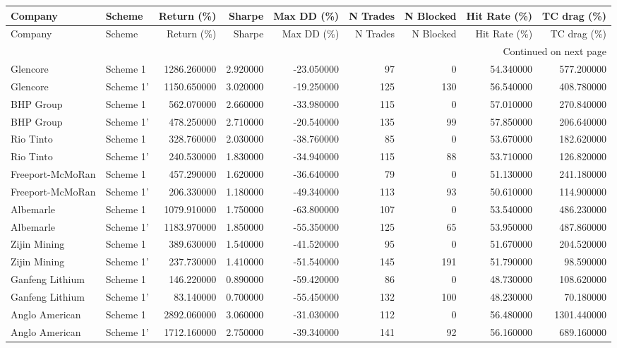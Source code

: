 \begin{longtable}{llrrrrrrr}
\toprule
Company & Scheme & Return (\%) & Sharpe & Max DD (\%) & N Trades & N Blocked & Hit Rate (\%) & TC drag (\%) \\
\midrule
\endfirsthead
\toprule
Company & Scheme & Return (\%) & Sharpe & Max DD (\%) & N Trades & N Blocked & Hit Rate (\%) & TC drag (\%) \\
\midrule
\endhead
\midrule
\multicolumn{9}{r}{Continued on next page} \\
\midrule
\endfoot
\bottomrule
\endlastfoot
Glencore & Scheme 1 & 1286.260000 & 2.920000 & -23.050000 & 97 & 0 & 54.340000 & 577.200000 \\
Glencore & Scheme 1' & 1150.650000 & 3.020000 & -19.250000 & 125 & 130 & 56.540000 & 408.780000 \\
BHP Group & Scheme 1 & 562.070000 & 2.660000 & -33.980000 & 115 & 0 & 57.010000 & 270.840000 \\
BHP Group & Scheme 1' & 478.250000 & 2.710000 & -20.540000 & 135 & 99 & 57.850000 & 206.640000 \\
Rio Tinto & Scheme 1 & 328.760000 & 2.030000 & -38.760000 & 85 & 0 & 53.670000 & 182.620000 \\
Rio Tinto & Scheme 1' & 240.530000 & 1.830000 & -34.940000 & 115 & 88 & 53.710000 & 126.820000 \\
Freeport-McMoRan & Scheme 1 & 457.290000 & 1.620000 & -36.640000 & 79 & 0 & 51.130000 & 241.180000 \\
Freeport-McMoRan & Scheme 1' & 206.330000 & 1.180000 & -49.340000 & 113 & 93 & 50.610000 & 114.900000 \\
Albemarle & Scheme 1 & 1079.910000 & 1.750000 & -63.800000 & 107 & 0 & 53.540000 & 486.230000 \\
Albemarle & Scheme 1' & 1183.970000 & 1.850000 & -55.350000 & 125 & 65 & 53.950000 & 487.860000 \\
Zijin Mining & Scheme 1 & 389.630000 & 1.540000 & -41.520000 & 95 & 0 & 51.670000 & 204.520000 \\
Zijin Mining & Scheme 1' & 237.730000 & 1.410000 & -51.540000 & 145 & 191 & 51.790000 & 98.590000 \\
Ganfeng Lithium & Scheme 1 & 146.220000 & 0.890000 & -59.420000 & 86 & 0 & 48.730000 & 108.620000 \\
Ganfeng Lithium & Scheme 1' & 83.140000 & 0.700000 & -55.450000 & 132 & 100 & 48.230000 & 70.180000 \\
Anglo American & Scheme 1 & 2892.060000 & 3.060000 & -31.030000 & 112 & 0 & 56.480000 & 1301.440000 \\
Anglo American & Scheme 1' & 1712.160000 & 2.750000 & -39.340000 & 141 & 92 & 56.160000 & 689.160000 \\
\end{longtable}
